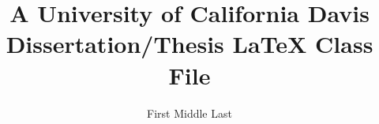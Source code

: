 \documentclass[12pt,draftcls]{ucdavisthesis}
\title          {A University of California Davis\\
                 Dissertation/Thesis LaTeX Class File}
\author         {First Middle Last}
\begin{document}
\newcommand{\bibfont}{\singlespacing}



\makeintropages %







\end{document}

